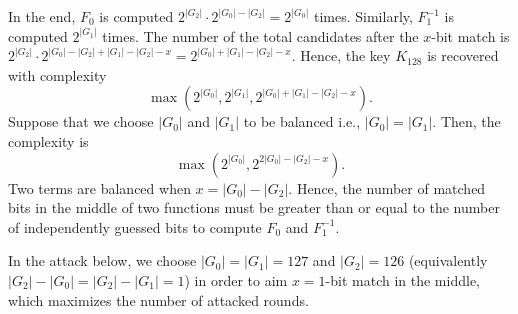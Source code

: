 In the end,
$F_0$ is computed $2^{|G_2|} \cdot 2^{|G_0|-|G_2|} = 2^{|G_0|}$ times.
Similarly, $F_1^{-1}$ is computed $2^{|G_1|}$ times. The number of the total candidates after the $x$-bit match is $2^{|G_2|} \cdot 2^{|G_0|-|G_2| + |G_1|-|G_2| - x} = 2^{|G_0| + |G_1| - |G_2| - x}$. Hence, the key $K_{128}$ is recovered with complexity $$\max( 2^{|G_0|}, 2^{|G_1|}, 2^{|G_0| + |G_1| - |G_2| - x}).$$
Suppose that we choose $|G_0|$ and $|G_1|$ to be balanced i.e., $|G_0|=|G_1|$. Then, the complexity is $$\max( 2^{|G_0|}, 2^{2|G_0| - |G_2| - x}).$$
Two terms are balanced when $x = |G_0| - |G_2|$. Hence, the number of matched bits in the middle of two functions must be greater than or equal to the number of independently guessed bits to compute $F_0$ and $F_1^{-1}$.

In the attack below, we choose $|G_0|=|G_1|=127$ and $|G_2|=126$ (equivalently $|G_2|-|G_0| = |G_2|-|G_1| = 1$) in order to aim $x=1$-bit match in the middle, which maximizes the number of attacked rounds.

